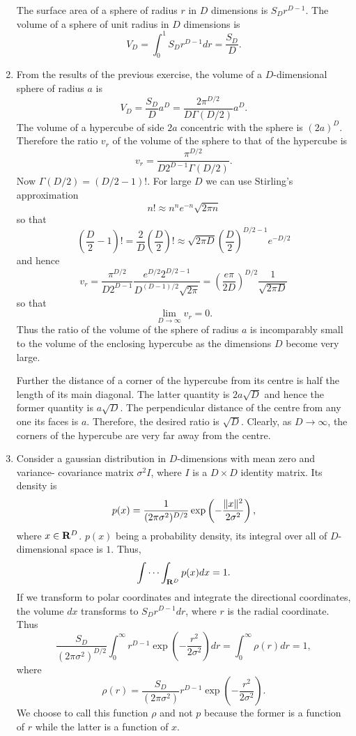 \begin{enumerate}
The surface area of a sphere of radius $r$ in $D$ dimensions is $S_D r^{D-1}$. The volume of a
sphere of unit radius in $D$ dimensions is
\[
V_D = \int_0^1 S_D r^{D-1}dr = \frac{S_D}{D}.
\]

\item From the results of the previous exercise, the volume of a $D$-dimensional sphere of
radius $a$ is
\[
V_D = \frac{S_D}{D}a^D = \frac{2\pi^{D/2}}{D\Gamma(D/2)}a^D.
\]
The volume of a hypercube of side $2a$ concentric with the sphere is $(2a)^D$. Therefore the
ratio $v_r$ of the volume of the sphere to that of the hypercube is
\[
v_r = \frac{\pi^{D/2}}{D2^{D-1}\Gamma(D/2)}.
\]
Now $\Gamma(D/2) = (D/2 - 1)!$. For large $D$ we can use Stirling's approximation
\[
n! \approx n^ne^{-n}\sqrt{2\pi n}
\]
so that
\[
\left(\frac{D}{2} - 1\right)! = \frac{2}{D}\left(\frac{D}{2}\right)! \approx 
\sqrt{2\pi D} \left(\frac{D}{2}\right)^{D/2 - 1} e^{-D/2}
\]
and hence
\[
v_r = \frac{\pi^{D/2}}{D2^{D-1}}\frac{e^{D/2}2^{D/2 - 1}}{D^{(D-1)/2}\sqrt{2\pi}}
= \left(\frac{e\pi}{2D}\right)^{D/2}\frac{1}{\sqrt{2\pi D}}
\]
so that
\[
\lim_{D \to \infty}v_r = 0.
\]
Thus the ratio of the volume of the sphere of radius $a$ is incomparably small to
the volume of the enclosing hypercube as the dimensions $D$ become very large.

Further the distance of a corner of the hypercube from its centre is half the length
of its main diagonal. The latter quantity is $2a\sqrt{D}$ and hence the former quantity 
is $a\sqrt{D}$. The perpendicular distance of the centre from any one its faces is
$a$. Therefore, the desired ratio is $\sqrt{D}$. Clearly, as $D \to \infty$, the corners
of the hypercube are very far away from the centre.

\item Consider a gaussian distribution in $D$-dimensions with mean zero and variance-
covariance matrix $\sigma^2 I$, where $I$ is a $D \times D$ identity matrix. Its
density is
\[
p(x) = \frac{1}{(2\pi\sigma^2)^{D/2}}\exp\left(-\frac{\lVert x\rVert^2}{2\sigma^2}\right),
\]
where $x \in \mathbf{R}^D$. $p(x)$ being a probability density, its integral over all
of $D$-dimensional space is $1$. Thus,
\[
\int \cdots \int_{\mathbf{R}^D}p(x)dx = 1.
\]
If we transform to polar coordinates and integrate the directional coordinates, the 
volume $dx$ transforms to $S_D r^{D-1}dr$, where $r$ is the radial coordinate. Thus
\[
\frac{S_D}{(2\pi\sigma^2)^{D/2}}\int_0^\infty r^{D-1}\exp\left(-\frac{r^2}{2\sigma^2}\right)dr = \int_0^\infty\rho(r)dr = 1,
\]
where 
\[
\rho(r) = \frac{S_D}{(2\pi\sigma^2)}r^{D-1}\exp\left(-\frac{r^2}{2\sigma^2}\right).
\]
We choose to call this function $\rho$ and not $p$ because the former is a function of $r$ while
the latter is a function of $x$.


\end{enumerate}
